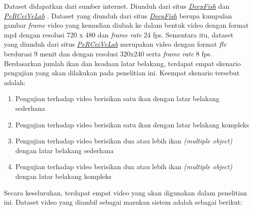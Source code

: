         Dataset didapatkan dari sumber internet. Diunduh dari situs \href{https://alzayats.github.io/DeepFish/}{\textit{DeepFish}} \citep{Saleh2020} dan \href{http://www.perceivelab.com/datasets}{\textit{PeRCeiVeLab}} \citep{Kavasidis2012}. Dataset yang diunduh dari situs \href{https://alzayats.github.io/DeepFish/}{\textit{DeepFish}} berupa kumpulan gambar \textit{frame} video yang kemudian diubah ke dalam bentuk video dengan format mp4 dengan resolusi 720 x 480 dan \textit{frame rate} 24 fps. Sementara itu, dataset yang diunduh dari situs \href{http://www.perceivelab.com/datasets}{\textit{PeRCeiVeLab}} merupakan video dengan format \textit{flv} berdurasi 9 menit dan dengan resolusi 320x240 serta \textit{frame rate} 8 fps. Berdasarkan jumlah ikan dan keadaan latar belakang, terdapat empat skenario pengujian yang akan dilakukan pada penelitian ini. Keempat skenario tersebut adalah:
            \begin{enumerate}
                \item Pengujian terhadap video berisikan satu ikan dengan latar belakang sederhana
                \item Pengujian terhadap video berisikan satu ikan dengan latar belakang kompleks
                \item Pengujian terhadap video berisikan dua atau lebih ikan \textit{(multiple object)} dengan latar belakang sederhana
                \item Pengujian terhadap video berisikan dua atau lebih ikan \textit{(multiple object)} dengan latar belakang kompleks
            \end{enumerate}
        Secara keseluruhan, terdapat empat video yang akan digunakan dalam penelitian ini. Dataset video yang diambil sebagai masukan sistem adalah sebagai berikut:
